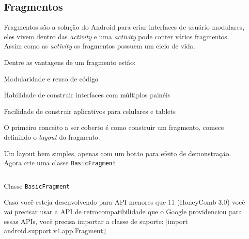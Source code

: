 \documentclass[a4paper,12pt,brazil]{book}
\begin{document}
\begin{singlespace}
\section{Fragmentos}
\label{sec:frags}

Fragmentos são a solução do Android para criar interfaces de usuário modulares, eles vivem dentro das \emph{activity} e uma \emph{activity} pode conter vários fragmentos. Assim como as \emph{activity} os fragmentos possuem um ciclo de vida. %

Dentre as vantagens de um fragmento estão:
\bi
	\item Modularidade e reuso de código
	\item Habilidade de construir interfaces com múltiplos painéis
	\item Facilidade de construir aplicativos para celulares e tablets
\ei

O primeiro conceito a ser coberto é como construir um fragmento, comece definindo o \emph{layout} do fragmento.

Um layout bem simples, apenas com um botão para efeito de demonstração. Agora crie uma classe \texttt{BasicFragment}

\begin{listing}[H]
\inputminted[linenos=true,fontsize=\small,frame=lines, framesep=2mm, tabsize=2,numbersep=5pt]{java}{src/design/basicfragment.java}
\caption{Classe \texttt{BasicFragment}}
\end{listing}	

Caso você esteja desenvolvendo para API menores que 11 (HoneyComb 3.0) você vai precisar usar a API de retrocompatibilidade que o Google providenciou para essas APIs, você precisa importar a classe de suporte: |import android.support.v4.app.Fragment;|




\end{singlespace}
\end{document}
